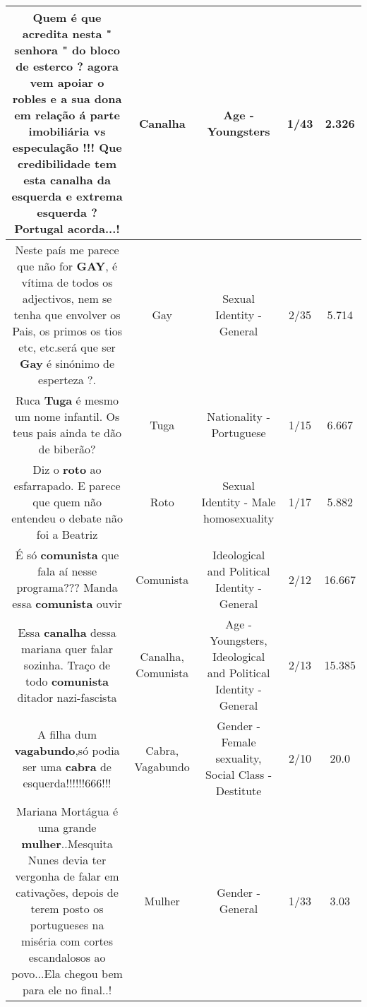 \documentclass[11pt]{article}
\newlength\mylength
\begin{document}
\begin{center}
\begin{longtable}{|C{.65\mylength}|C{.30\mylength}|C{.12\mylength}|C{.12\mylength}|C{.12\mylength}|}
  \small Quem é que acredita nesta " senhora " do bloco de esterco ? agora vem apoiar o robles e a sua dona em relação á parte imobiliária vs especulação !!! Que credibilidade tem esta \textbf{canalha} da esquerda e extrema esquerda ? Portugal acorda...!\normalsize   & Canalha & Age - Youngsters & 1/43 & 2.326 \\  \hline
  \small Neste país me parece que não for \textbf{GAY}, é vítima de todos os adjectivos, nem se tenha que envolver os Pais, os primos os tios etc, etc.será que ser \textbf{Gay} é sinónimo de esperteza ?.\normalsize   & Gay & Sexual Identity - General & 2/35 & 5.714 \\  \hline
  \small Ruca \textbf{Tuga} é mesmo um nome infantil. Os teus pais ainda te dão de biberão?\normalsize   & Tuga & Nationality - Portuguese & 1/15 & 6.667 \\  \hline
  \small Diz o \textbf{roto} ao esfarrapado. E parece que quem não entendeu o debate não foi a Beatriz\normalsize   & Roto & Sexual Identity - Male homosexuality & 1/17 & 5.882 \\  \hline
  \small É só \textbf{comunista} que fala aí nesse programa??? Manda essa \textbf{comunista} ouvir\normalsize   & Comunista & Ideological and Political Identity - General & 2/12 & 16.667 \\  \hline
  \small Essa \textbf{canalha} dessa mariana quer falar sozinha. Traço de todo \textbf{comunista} ditador nazi-fascista\normalsize   & Canalha, Comunista & Age - Youngsters, Ideological and Political Identity - General & 2/13 & 15.385 \\  \hline
  \small A filha dum \textbf{vagabundo},só podia ser uma \textbf{cabra} de esquerda!!!!!!666!!!\normalsize   & Cabra, Vagabundo & Gender - Female sexuality, Social Class - Destitute & 2/10 & 20.0 \\  \hline
  \small Mariana Mortágua é uma grande \textbf{mulher}..Mesquita Nunes devia ter vergonha de falar em cativações, depois de terem posto os portugueses na miséria com cortes escandalosos ao povo...Ela chegou bem para ele no final..!\normalsize   & Mulher & Gender - General & 1/33 & 3.03 \\  \hline

\end{longtable}
\end{center}
\end{document}
